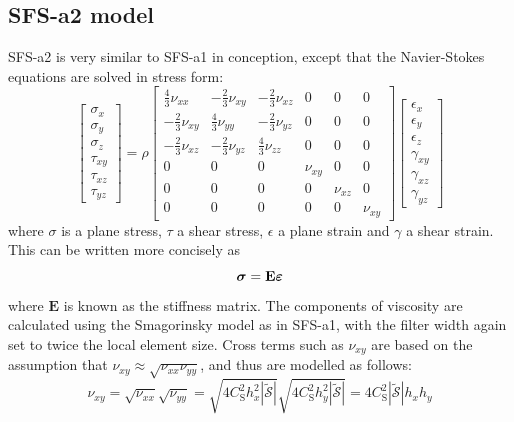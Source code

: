 \subsection{SFS-a2 model}
SFS-a2 is very similar to SFS-a1 in conception, except that the
Navier-Stokes equations are solved in stress form:
\begin{equation}
\left[ \begin{array}{c}
\sigma_x \\ \sigma_y \\ \sigma_z \\
\tau_{xy} \\ \tau_{xz} \\ \tau_{yz}
\end{array} \right] =
\rho \begin{bmatrix} \frac{4}{3}\nu_{xx} & -\frac{2}{3}\nu_{xy} &
-\frac{2}{3}\nu_{xz} & 0 & 0 & 0 \\
-\frac{2}{3}\nu_{xy} & \frac{4}{3}\nu_{yy} &
-\frac{2}{3}\nu_{yz} & 0 & 0 & 0 \\
-\frac{2}{3}\nu_{xz} & -\frac{2}{3}\nu_{yz} &
\frac{4}{3}\nu_{zz} & 0 & 0 & 0 \\
0 & 0 & 0 & \nu_{xy} & 0 & 0 \\
0 & 0 & 0 & 0 & \nu_{xz} & 0 \\
0 & 0 & 0 & 0 & 0 & \nu_{xy} \end{bmatrix} \left[ \begin{array}{c}
\epsilon_x \\ \epsilon_y \\ \epsilon_z \\
\gamma_{xy} \\ \gamma_{xz} \\ \gamma_{yz}
\end{array} \right]
\end{equation}
where $\sigma$ is a plane stress, $\tau$ a shear stress,
$\epsilon$ a plane strain and $\gamma$ a shear strain. This can be
written more concisely as
\begin{equation}
\mbox{\boldmath $\sigma$} = \mathbf{E} \mbox{\boldmath $\epsilon$}
\end{equation}
where $\mathbf{E}$ is known as the stiffness matrix. The
components of viscosity are calculated using the Smagorinsky model
as in SFS-a1, with the filter width again set to twice the local
element size. Cross terms such as $\nu_{xy}$ are based on the
assumption that $\nu_{xy}\approx\sqrt{\nu_{xx}\nu_{yy}}$, and thus
are modelled as follows:
\begin{equation}
\nu_{xy}=\sqrt{\nu_{xx}}\sqrt{\nu_{yy}}= \sqrt{4 C_{\textrm{S}}^2
h_x^2 |\tilde{\mathcal{S}}|} \sqrt{4 C_{\textrm{S}}^2 h_y^2
|\tilde{\mathcal{S}}|} = 4 C_{\textrm{S}}^2 |\tilde{\mathcal{S}}|
h_x h_y
\end{equation}
